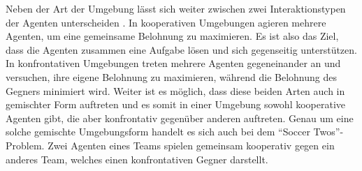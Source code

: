 Neben der Art der Umgebung lässt sich weiter zwischen zwei Interaktionstypen der Agenten unterscheiden \cite{10.1007/11691839_1}. In kooperativen Umgebungen agieren mehrere Agenten, um eine gemeinsame Belohnung zu maximieren. Es ist also das Ziel, dass die Agenten zusammen eine Aufgabe lösen und sich gegenseitig unterstützen. In konfrontativen Umgebungen treten mehrere Agenten gegeneinander an und versuchen, ihre eigene Belohnung zu maximieren, während die Belohnung des Gegners minimiert wird.
Weiter ist es möglich, dass diese beiden Arten auch in gemischter Form auftreten und es somit in einer Umgebung sowohl kooperative Agenten gibt, die aber konfrontativ gegenüber anderen auftreten. Genau um eine solche gemischte Umgebungsform handelt es sich auch bei dem ``Soccer Twos''-Problem. Zwei Agenten eines Teams spielen gemeinsam kooperativ gegen ein anderes Team, welches einen konfrontativen Gegner darstellt.



